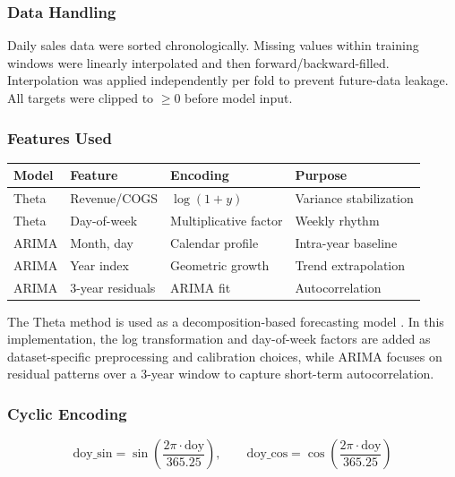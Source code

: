 \documentclass[12pt,a4paper]{article}
\begin{document}
\subsubsection{Data Handling}

Daily sales data were sorted chronologically. Missing values within training windows were linearly interpolated and then forward/backward-filled. Interpolation was applied independently per fold to prevent future-data leakage. All targets were clipped to $\geq 0$ before model input.

\subsubsection{Features Used}

\begin{center}
\centering
{}
\label{tab:features-used}
\small
\begin{tabular}{llll}
\toprule
\textbf{Model} & \textbf{Feature} & \textbf{Encoding} & \textbf{Purpose} \\
\midrule
Theta & Revenue/COGS & $\log(1+y)$ & Variance stabilization \\
Theta & Day-of-week & Multiplicative factor & Weekly rhythm \\
ARIMA & Month, day & Calendar profile & Intra-year baseline \\
ARIMA & Year index & Geometric growth & Trend extrapolation \\
ARIMA & 3-year residuals & ARIMA fit & Autocorrelation \\
\bottomrule
\end{tabular}
\end{center}

The Theta method is used as a decomposition-based forecasting model \cite{Assimakopoulos2000}. In this implementation, the log transformation and day-of-week factors are added as dataset-specific preprocessing and calibration choices, while ARIMA focuses on residual patterns over a 3-year window to capture short-term autocorrelation.

\subsubsection{Cyclic Encoding}

\[
\mathrm{doy\_sin} = \sin\left(\frac{2\pi \cdot \mathrm{doy}}{365.25}\right),
\qquad
\mathrm{doy\_cos} = \cos\left(\frac{2\pi \cdot \mathrm{doy}}{365.25}\right)
\]
\end{document}

